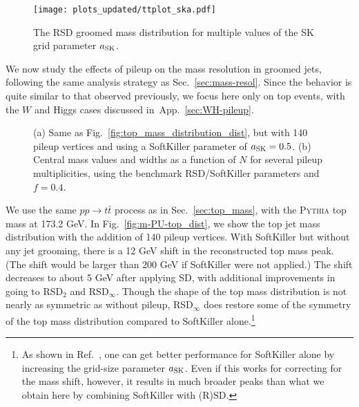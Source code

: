 \documentclass[11pt,a4paper]{article}
\DeclareRobustCommand{\Sec}[1]{Sec.~\ref{#1}}
\DeclareRobustCommand{\App}[1]{App.~\ref{#1}}
\DeclareRobustCommand{\Fig}[1]{Fig.~\ref{#1}}
\DeclareRobustCommand{\Ref}[1]{Ref.~\cite{#1}}
\begin{document}
\begin{figure}
  \centering
  \texttt{[image: plots\_updated/ttplot\_ska.pdf]}
  \caption{The RSD groomed mass distribution for multiple values of
    the SK grid parameter $a_{\rm SK}$.
    }
  \label{fig:SK-scan}
\end{figure}

We now study the effects of pileup on the mass resolution in groomed jets, following the same analysis strategy as \Sec{sec:mass-resol}.
%
Since the behavior is quite similar to that observed previously, we focus here only on top events, with the $W$ and Higgs cases discussed
in~\App{sec:WH-pileup}.
%

\begin{figure}[t]
  \centering
  \qquad
  \caption{(a) Same as \Fig{fig:top_mass_distribution_dist}, but with
    140 pileup vertices and using a SoftKiller parameter of
    $a_{\rm SK}=0.5$.  (b) Central mass values and widths as a
    function of $N$ for several pileup multiplicities, using the
    benchmark RSD/SoftKiller parameters and $f = 0.4$.}
  \label{fig:m-PU-top}
\end{figure}

We use the same $pp \to t \bar{t}$ process as in \Sec{sec:top_mass}, with the \textsc{Pythia} top mass at 173.2 GeV.
%
In \Fig{fig:m-PU-top_dist}, we show the top jet mass distribution with the addition of 140 pileup vertices.
%
With SoftKiller but without any jet grooming, there is a 12 GeV shift in the reconstructed top mass peak.
%
(The shift would be larger than 200 GeV if SoftKiller were not applied.)
%
The shift decreases to about 5 GeV after applying SD, with additional improvements in going to RSD$_2$ and RSD$_\infty$.
%
Though the shape of the top mass distribution is not nearly as
symmetric as without pileup, RSD$_\infty$ does restore some of the
symmetry of the top mass distribution compared to SoftKiller
alone.\footnote{As shown in \Ref{Cacciari:2014gra}, one can get better performance for SoftKiller alone by increasing the grid-size parameter $a_{\rm
    SK}$. Even if this works for correcting for the mass
  shift, however, it results in much broader peaks than what we obtain here by
  combining SoftKiller with (R)SD.}
\end{document}
